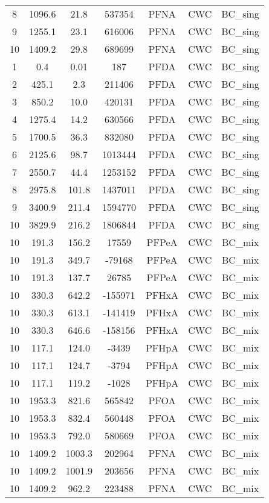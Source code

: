 \begin{longtable}[c]{ccccccc}
8 & 1096.6 & 21.8 & 537354 & PFNA & CWC & BC\_sing \\
9 & 1255.1 & 23.1 & 616006 & PFNA & CWC & BC\_sing \\
10 & 1409.2 & 29.8 & 689699 & PFNA & CWC & BC\_sing \\
1 & 0.4 & 0.01 & 187 & PFDA & CWC & BC\_sing \\
2 & 425.1 & 2.3 & 211406 & PFDA & CWC & BC\_sing \\
3 & 850.2 & 10.0 & 420131 & PFDA & CWC & BC\_sing \\
4 & 1275.4 & 14.2 & 630566 & PFDA & CWC & BC\_sing \\
5 & 1700.5 & 36.3 & 832080 & PFDA & CWC & BC\_sing \\
6 & 2125.6 & 98.7 & 1013444 & PFDA & CWC & BC\_sing \\
7 & 2550.7 & 44.4 & 1253152 & PFDA & CWC & BC\_sing \\
8 & 2975.8 & 101.8 & 1437011 & PFDA & CWC & BC\_sing \\
9 & 3400.9 & 211.4 & 1594770 & PFDA & CWC & BC\_sing \\
10 & 3829.9 & 216.2 & 1806844 & PFDA & CWC & BC\_sing \\
10 & 191.3 & 156.2 & 17559 & PFPeA & CWC & BC\_mix \\
10 & 191.3 & 349.7 & -79168 & PFPeA & CWC & BC\_mix \\
10 & 191.3 & 137.7 & 26785 & PFPeA & CWC & BC\_mix \\
10 & 330.3 & 642.2 & -155971 & PFHxA & CWC & BC\_mix \\
10 & 330.3 & 613.1 & -141419 & PFHxA & CWC & BC\_mix \\
10 & 330.3 & 646.6 & -158156 & PFHxA & CWC & BC\_mix \\
10 & 117.1 & 124.0 & -3439 & PFHpA & CWC & BC\_mix \\
10 & 117.1 & 124.7 & -3794 & PFHpA & CWC & BC\_mix \\
10 & 117.1 & 119.2 & -1028 & PFHpA & CWC & BC\_mix \\
10 & 1953.3 & 821.6 & 565842 & PFOA & CWC & BC\_mix \\
10 & 1953.3 & 832.4 & 560448 & PFOA & CWC & BC\_mix \\
10 & 1953.3 & 792.0 & 580669 & PFOA & CWC & BC\_mix \\
10 & 1409.2 & 1003.3 & 202964 & PFNA & CWC & BC\_mix \\
10 & 1409.2 & 1001.9 & 203656 & PFNA & CWC & BC\_mix \\
10 & 1409.2 & 962.2 & 223488 & PFNA & CWC & BC\_mix \\

\end{longtable}

